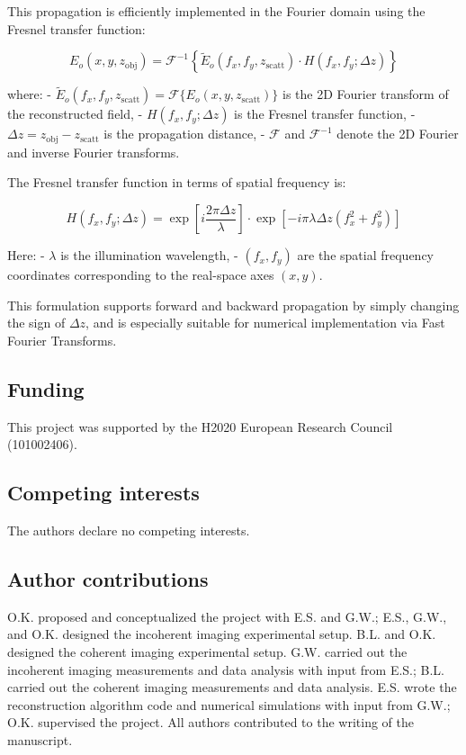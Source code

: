 \documentclass[pdflatex,sn-mathphys-num]{sn-jnl}%
\theoremstyle{thmstyleone}%
\theoremstyle{thmstyletwo}%
\theoremstyle{thmstylethree}%
\begin{document}
This propagation is efficiently implemented in the Fourier domain using the Fresnel transfer function:

\begin{equation}
    E_o(x, y, z_{\text{obj}}) = \mathcal{F}^{-1} \left\{ \tilde{E}_o(f_x, f_y, z_{\text{scatt}}) \cdot H(f_x, f_y; \Delta z) \right\}
\end{equation}

where:
- $ \tilde{E}_o(f_x, f_y, z_{\text{scatt}}) = \mathcal{F}\{ E_o(x, y, z_{\text{scatt}}) \} $ is the 2D Fourier transform of the reconstructed field,
- $ H(f_x, f_y; \Delta z) $ is the Fresnel transfer function,
- $ \Delta z = z_{\text{obj}} - z_{\text{scatt}} $ is the propagation distance,
- $ \mathcal{F} $ and $ \mathcal{F}^{-1} $ denote the 2D Fourier and inverse Fourier transforms.

The Fresnel transfer function in terms of spatial frequency is:

\begin{equation}
    H(f_x, f_y; \Delta z) = \exp\left[ i \frac{2\pi \Delta z}{\lambda} \right] \cdot \exp\left[ -i \pi \lambda \Delta z (f_x^2 + f_y^2) \right]
\end{equation}

Here:
- $ \lambda $ is the illumination wavelength,
- $ (f_x, f_y) $ are the spatial frequency coordinates corresponding to the real-space axes $ (x, y) $.

This formulation supports forward and backward propagation by simply changing the sign of $ \Delta z $, and is especially suitable for numerical implementation via Fast Fourier Transforms.

\newpage


\subsection*{Funding}
\noindent This project was supported by the H2020 European Research Council (101002406).
\subsection*{Competing interests}
\noindent The authors declare no competing interests.
\subsection*{Author contributions}
O.K. proposed and conceptualized the project with E.S. and G.W.; E.S., G.W., and O.K. designed the incoherent imaging experimental setup. B.L. and O.K. designed the coherent imaging experimental setup. G.W. carried out the incoherent imaging measurements and data analysis with input from E.S.; B.L. carried out the coherent imaging measurements and data analysis. E.S. wrote the reconstruction algorithm code and numerical simulations with input from G.W.; O.K. supervised the project. All authors contributed to the writing of the manuscript.
\end{document}
